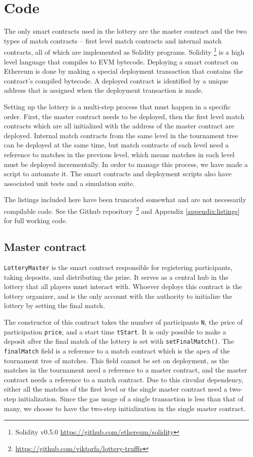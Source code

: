 \section{Code}
\label{sec:code}

The only smart contracts used in the lottery are the master contract and the two types of match contracts – first level match contracts and internal match contracts, all of which are implemented as Solidity programs. Solidity \footnote{Solidity v0.5.0 \url{https://github.com/ethereum/solidity}} is a high level language that compiles to EVM bytecode. Deploying a smart contract on Ethereum is done by making a special deployment transaction that contains the contract's compiled bytecode. A deployed contract is identified by a unique address that is assigned when the deployment transaction is made.

Setting up the lottery is a multi-step process that must happen in a specific order. First, the master contract needs to be deployed, then the first level match contracts which are all initialized with the address of the master contract are deployed. Internal match contracts from the same level in the tournament tree can be deployed at the same time, but match contracts of each level need a reference to matches in the previous level, which means matches in each level must be deployed incrementally. In order to manage this process, we have made a script to automate it. The smart contracts and deployment scripts also have associated unit tests and a simulation suite.

The listings included here have been truncated somewhat and are not necessarily compilable code. See the Github repository~\footnote{\url{https://github.com/viktorfa/lottery-truffle}} and Appendix \ref{appendix:listings} for full working code.

\subsection{Master contract}
\texttt{LotteryMaster} is the smart contract responsible for registering participants, taking deposits, and distributing the prize. It serves as a central hub in the lottery that all players must interact with. Whoever deploys this contract is the lottery organizer, and is the only account with the authority to initialize the lottery by setting the final match. 

The constructor of this contract takes the number of participants \texttt{N}, the price of participation \texttt{price}, and a start time \texttt{tStart}. It is only possible to make a deposit after the final match of the lottery is set with \texttt{setFinalMatch()}. The \texttt{finalMatch} field is a reference to a match contract which is the apex of the tournament tree of matches. This field cannot be set on deployment, as the matches in the tournament need a reference to a master contract, and the master contract needs a reference to a match contract. Due to this circular dependency, either all the matches of the first level or the single master contract need a two-step initialization. Since the gas usage of a single transaction is less than that of many, we choose to have the two-step initialization in the single master contract.


